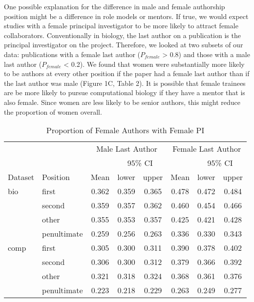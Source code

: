 \documentclass[10pt,letterpaper]{article}
\begin{document}
\begin{flushleft}
One possible explanation for the difference in male and female authorship position might be a difference in role models or mentors. If true, we would expect studies with a female principal investigator to be more likely to attract female collaborators. Conventionally in biology,  the last author on a publication is the principal investigator on the project. Therefore, we looked at two subsets of our data: publications with a female last author ($P_{female}$ > 0.8) and those with a male last author ($P_{female}$ < 0.2). We found that women were substantially more likely to be authors at every other position if the paper had a female last author than if the last author was male (Figure 1C, Table 2). It is possible that female trainees are be more likely to pursue computational biology if they have a mentor that is also female. Since women are less likely to be senior authors, this might reduce the proportion of women overall.

\begin{table}[]
\centering
\caption{Proportion of Female Authors with Female PI}
\label{Table 2}
\begin{tabular}{llcccccc}
\toprule
        &                 & \multicolumn{3}{c}{Male Last Author} & \multicolumn{3}{c}{Female Last Author} \\
\cmidrule(r){3-8}
        &                 &       & \multicolumn{2}{c}{95\% CI}  &        & \multicolumn{2}{c}{95\% CI}   \\
\cmidrule(r){4-5}\cmidrule(r){7-8}
Dataset & Position        & Mean  & lower        & upper         & Mean   & lower        & upper          \\
\midrule
bio     & first           & 0.362 & 0.359        & 0.365          & 0.478 & 0.472        & 0.484          \\
        & second          & 0.359 & 0.357        & 0.362          & 0.460 & 0.454        & 0.466          \\
        & other           & 0.355 & 0.353        & 0.357          & 0.425 & 0.421        & 0.428          \\
        & penultimate     & 0.259 & 0.256        & 0.263          & 0.336 & 0.330        & 0.343          \\
comp    & first           & 0.305 & 0.300        & 0.311          & 0.390 & 0.378        & 0.402          \\
        & second          & 0.306 & 0.300        & 0.312          & 0.379 & 0.366        & 0.392          \\
        & other           & 0.321 & 0.318        & 0.324          & 0.368 & 0.361        & 0.376          \\
        & penultimate     & 0.223 & 0.218        & 0.229          & 0.263 & 0.249        & 0.277          \\
\bottomrule
\end{tabular}
\end{table}


\end{flushleft}
\end{document}
